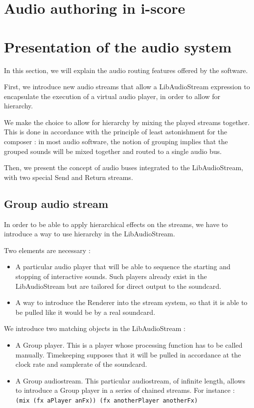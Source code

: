 \documentclass{article}
\begin{document}
\section{Audio authoring in i-score}

\section{Presentation of the audio system}
In this section, we will explain the audio routing 
features offered by the software.

First, we introduce new audio streams that allow a LibAudioStream
expression to encapsulate the execution of a virtual audio player, 
in order to allow for hierarchy.

We make the choice to allow for hierarchy by mixing the played streams together.
This is done in accordance with the principle of least astonishment\cite{seebach2001cranky} for the composer : 
in most audio software, the notion of grouping implies that the grouped sounds will be mixed 
together and routed to a single audio bus.

Then, we present the concept of audio buses integrated to the LibAudioStream,
with two special Send and Return streams.

\subsection{Group audio stream}
In order to be able to apply hierarchical effects on the streams, 
we have to introduce a way to use hierarchy in the LibAudioStream.

Two elements are necessary : 
\begin{itemize}
	\item A particular audio player that will be able to sequence the starting and stopping 
	of interactive sounds.
	Such players already exist in the LibAudioStream but are tailored for direct output to
	the soundcard.
	\item A way to introduce the Renderer into the stream system, so that it 
	is able to be pulled like it would be by a real soundcard.
\end{itemize}

We introduce two matching objects in the LibAudioStream : 
\begin{itemize}
	\item A Group player. This is a player whose processing function has to be called manually. 
	Timekeeping supposes that it will be pulled in accordance at the clock rate
	and samplerate of the soundcard.
	\item A Group audiostream. This particular audiostream, of infinite length, 
	allows to introduce a Group player in a series of chained streams.
	For instance : \lstinline{(mix (fx aPlayer anFx)) (fx anotherPlayer anotherFx)}
\end{itemize}
\end{document}
